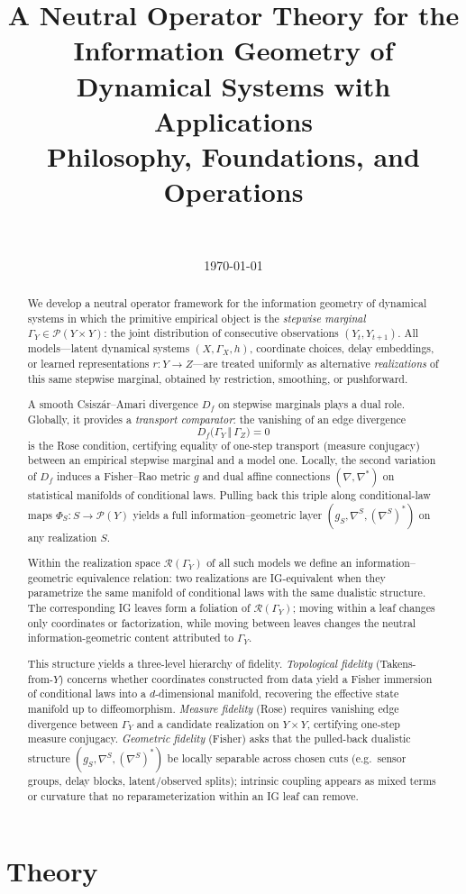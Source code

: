 \documentclass[11pt]{article}
\title{A Neutral Operator Theory for the Information Geometry of Dynamical Systems with Applications\\[2pt]
\large Philosophy, Foundations, and Operations}
\author{~}
\date{\today}
\newcommand{\1}{\mathbf{1}}
\begin{document}
\maketitle


\newpage

\tableofcontents

\newpage

\part{Theory}

\begin{abstract}
We develop a neutral operator framework for the information geometry of dynamical systems in which the primitive empirical object is the \emph{stepwise marginal} $\Gamma_Y \in \mathcal{P}(Y\times Y)$: the joint distribution of consecutive observations $(Y_t,Y_{t+1})$. All models---latent dynamical systems $(X,\Gamma_X,h)$, coordinate choices, delay embeddings, or learned representations $r:Y\to Z$---are treated uniformly as alternative \emph{realizations} of this same stepwise marginal, obtained by restriction, smoothing, or pushforward.

A smooth Csiszár--Amari divergence $D_f$ on stepwise marginals plays a dual role. Globally, it provides a \emph{transport comparator}: the vanishing of an edge divergence
\[
  D_f\bigl(\Gamma_Y \,\Vert\, \Gamma_Z\bigr) = 0
\]
is the Rose condition, certifying equality of one-step transport (measure conjugacy) between an empirical stepwise marginal and a model one. Locally, the second variation of $D_f$ induces a Fisher--Rao metric $g$ and dual affine connections $(\nabla,\nabla^\ast)$ on statistical manifolds of conditional laws. Pulling back this triple along conditional-law maps $\Phi_S:S\to\mathcal{P}(Y)$ yields a full information--geometric layer $(g_S,\nabla^S,(\nabla^S)^\ast)$ on any realization $S$.

Within the realization space $\mathcal{R}(\Gamma_Y)$ of all such models we define an information--geometric equivalence relation: two realizations are IG-equivalent when they parametrize the same manifold of conditional laws with the same dualistic structure. The corresponding IG leaves form a foliation of $\mathcal{R}(\Gamma_Y)$; moving within a leaf changes only coordinates or factorization, while moving between leaves changes the neutral information-geometric content attributed to $\Gamma_Y$.

This structure yields a three-level hierarchy of fidelity. \emph{Topological fidelity} (Takens-from-$Y$) concerns whether coordinates constructed from data yield a Fisher immersion of conditional laws into a $d$-dimensional manifold, recovering the effective state manifold up to diffeomorphism. \emph{Measure fidelity} (Rose) requires vanishing edge divergence between $\Gamma_Y$ and a candidate realization on $Y\times Y$, certifying one-step measure conjugacy. \emph{Geometric fidelity} (Fisher) asks that the pulled-back dualistic structure $(g_S,\nabla^S,(\nabla^S)^\ast)$ be locally separable across chosen cuts (e.g.\ sensor groups, delay blocks, latent/observed splits); intrinsic coupling appears as mixed terms or curvature that no reparameterization within an IG leaf can remove.


\end{abstract}
\end{document}
